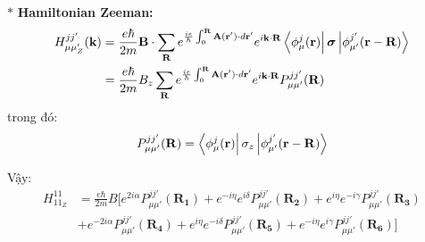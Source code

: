 \documentclass{article}
\begin{document}
\clearpage

\noindent $\ast$ \textbf{Hamiltonian Zeeman:}
\begin{align*}
    H_{\mu\mu'_{Z}}^{jj'}(\mathbf{k}) & = \dfrac{e\hbar}{2m}\textbf{B}\cdot \sum_{\mathbf{R}}^{} e^{\frac{ie}{\hbar}\int_{0}^{\mathbf{R}}\mathbf{A}(\mathbf{r'})\cdot d\mathbf{r'}} e^{i\mathbf{k\cdot R}} \bra{\phi_{\mu}^{j} (\mathbf{r})}\boldsymbol{\sigma}\ket{\phi_{\mu'}^{j'}(\mathbf{r - R})} \\
                                      & = \dfrac{e\hbar}{2m}B_z \sum_{\mathbf{R}}^{} e^{\frac{ie}{\hbar}\int_{0}^{\mathbf{R}}\mathbf{A}(\mathbf{r'})\cdot d\mathbf{r'}} e^{i\mathbf{k\cdot R}} P_{\mu\mu'}^{jj'}(\mathbf{R})
\end{align*}
trong đó:
\begin{align*}
    P_{\mu\mu'}^{jj'}(\mathbf{R}) = \bra{\phi_{\mu}^{j} (\mathbf{r})}{\sigma_z}\ket{\phi_{\mu'}^{j'}(\mathbf{r - R})}
\end{align*}

Vậy:
\begin{align*}
    H_{11_{Z}}^{11} & = \frac{e\hbar}{2m}B \bigg[ e^{2i\alpha}P_{\mu\mu'}^{jj'}(\mathbf{R_1}) + e^{-i\eta} e^{i\delta}P_{\mu\mu'}^{jj'}(\mathbf{R_2}) + e^{i\eta} e^{-i\gamma}P_{\mu\mu'}^{jj'}(\mathbf{R_3})                                                                                                                                                           \\
                    & + e^{-2i\alpha}P_{\mu\mu'}^{jj'}(\mathbf{R_4}) + e^{i\eta} e^{-i\delta}P_{\mu\mu'}^{jj'}(\mathbf{R_5}) + e^{-i\eta} e^{i\gamma}P_{\mu\mu'}^{jj'}(\mathbf{R_6})  \bigg]  \\
\end{align*}






















\clearpage
\end{document}
